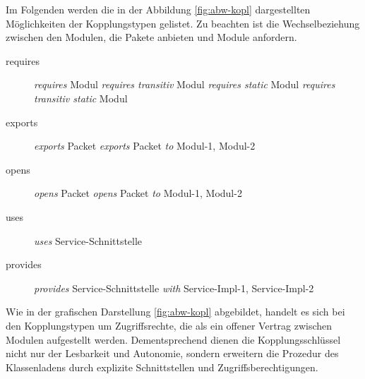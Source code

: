     Im Folgenden werden die in der Abbildung \ref{fig:abw-kopl} dargestellten Möglichkeiten der Kopplungstypen gelistet. Zu beachten ist die Wechselbeziehung zwischen den Modulen, die Pakete anbieten und Module anfordern. \cite{jmsOracle}

    \begin{description}
      \item[requires]\hfill
      \newline \textit{requires} Modul
      \newline \textit{requires transitiv} Modul
      \newline \textit{requires static} Modul
      \newline \textit{requires transitiv static} Modul
      \item[exports]\hfill
      \newline \textit{exports} Packet
      \newline \textit{exports} Packet \textit{to} Modul-1, Modul-2
      \item[opens]\hfill
      \newline \textit{opens} Packet
      \newline \textit{opens} Packet \textit{to} Modul-1, Modul-2
      \item [uses]\hfill
      \newline \textit{uses} Service-Schnittstelle 
      \item[provides]\hfill
        \newline \textit{provides} Service-Schnittstelle \textit{with} Service-Impl-1, Service-Impl-2
  \end{description}


  Wie in der grafischen Darstellung \ref{fig:abw-kopl} abgebildet, handelt es sich bei den Kopplungstypen um Zugriffsrechte, die als ein offener Vertrag zwischen Modulen aufgestellt werden. Dementsprechend dienen die Kopplungsschlüssel nicht nur der Lesbarkeit und Autonomie, sondern erweitern die Prozedur des Klassenladens durch explizite Schnittstellen und Zugriffsberechtigungen.\cite{modulMitJava9}

